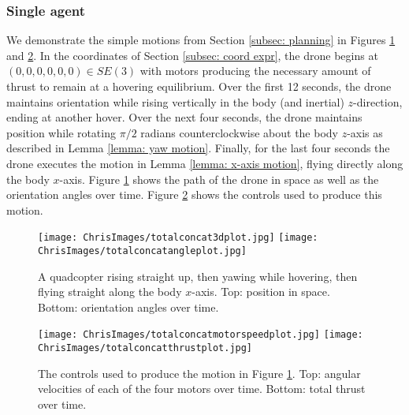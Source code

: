 \documentclass{aims}
\theoremstyle{definition}
\begin{document}
\subsubsection{Single agent}

We demonstrate the simple motions from Section \ref{subsec: planning} in Figures \ref{fig: up and over config} and \ref{fig: up and over controls}.  In the coordinates of Section \ref{subsec: coord expr}, the drone begins at $(0,0,0,0,0,0)\in SE(3)$ with motors producing the necessary amount of thrust to remain at a hovering equilibrium.  Over the first 12 seconds, the drone maintains orientation while rising vertically in the body (and inertial) $z$-direction, ending at another hover.  Over the next four seconds, the drone maintains position while rotating $\pi/2$ radians counterclockwise about the body $z$-axis as described in Lemma \ref{lemma: yaw motion}.  Finally, for the last four seconds the drone executes the motion in Lemma \ref{lemma: x-axis motion}, flying directly along the body $x$-axis.  Figure \ref{fig: up and over config} shows the path of the drone in space as well as the orientation angles over time.  Figure \ref{fig: up and over controls} shows the controls used to produce this motion.

\begin{figure}
\centering
    \texttt{[image: ChrisImages/totalconcat3dplot.jpg]}
    \texttt{[image: ChrisImages/totalconcatangleplot.jpg]}
    \caption{A quadcopter rising straight up, then yawing while hovering, then flying straight along the body $x$-axis.  Top: position in space.  Bottom: orientation angles over time.}\label{fig: up and over config}
\end{figure}

\begin{figure}
\centering
    \texttt{[image: ChrisImages/totalconcatmotorspeedplot.jpg]}
    \texttt{[image: ChrisImages/totalconcatthrustplot.jpg]}
    \caption{The controls used to produce the motion in Figure \ref{fig: up and over config}.  Top: angular velocities of each of the four motors over time.  Bottom: total thrust over time.}\label{fig: up and over controls}
\end{figure}
\end{document}
